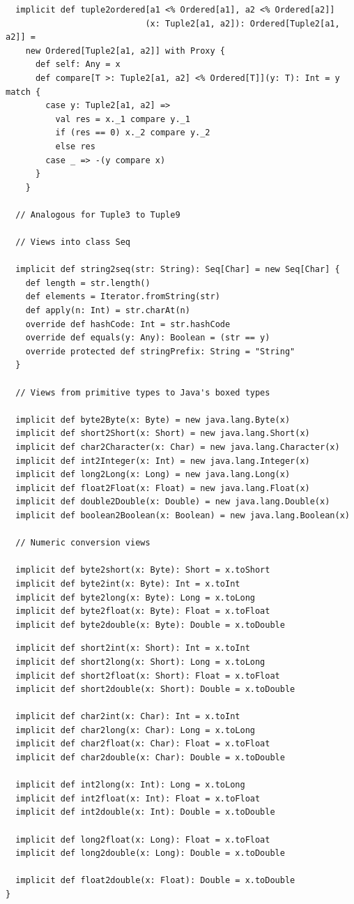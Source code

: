\begin{lstlisting}
  implicit def tuple2ordered[a1 <% Ordered[a1], a2 <% Ordered[a2]]
                            (x: Tuple2[a1, a2]): Ordered[Tuple2[a1, a2]] = 
    new Ordered[Tuple2[a1, a2]] with Proxy {
      def self: Any = x
      def compare[T >: Tuple2[a1, a2] <% Ordered[T]](y: T): Int = y match {
        case y: Tuple2[a1, a2] => 
          val res = x._1 compare y._1
          if (res == 0) x._2 compare y._2
          else res
        case _ => -(y compare x)
      }
    }

  // Analogous for Tuple3 to Tuple9

  // Views into class Seq

  implicit def string2seq(str: String): Seq[Char] = new Seq[Char] {
    def length = str.length()
    def elements = Iterator.fromString(str)
    def apply(n: Int) = str.charAt(n)
    override def hashCode: Int = str.hashCode
    override def equals(y: Any): Boolean = (str == y)
    override protected def stringPrefix: String = "String"
  }

  // Views from primitive types to Java's boxed types

  implicit def byte2Byte(x: Byte) = new java.lang.Byte(x)
  implicit def short2Short(x: Short) = new java.lang.Short(x)
  implicit def char2Character(x: Char) = new java.lang.Character(x)
  implicit def int2Integer(x: Int) = new java.lang.Integer(x)
  implicit def long2Long(x: Long) = new java.lang.Long(x)
  implicit def float2Float(x: Float) = new java.lang.Float(x)
  implicit def double2Double(x: Double) = new java.lang.Double(x)
  implicit def boolean2Boolean(x: Boolean) = new java.lang.Boolean(x)

  // Numeric conversion views

  implicit def byte2short(x: Byte): Short = x.toShort
  implicit def byte2int(x: Byte): Int = x.toInt
  implicit def byte2long(x: Byte): Long = x.toLong
  implicit def byte2float(x: Byte): Float = x.toFloat
  implicit def byte2double(x: Byte): Double = x.toDouble

\end{lstlisting}
\newpage
\begin{lstlisting}
  implicit def short2int(x: Short): Int = x.toInt
  implicit def short2long(x: Short): Long = x.toLong
  implicit def short2float(x: Short): Float = x.toFloat
  implicit def short2double(x: Short): Double = x.toDouble

  implicit def char2int(x: Char): Int = x.toInt
  implicit def char2long(x: Char): Long = x.toLong
  implicit def char2float(x: Char): Float = x.toFloat
  implicit def char2double(x: Char): Double = x.toDouble

  implicit def int2long(x: Int): Long = x.toLong
  implicit def int2float(x: Int): Float = x.toFloat
  implicit def int2double(x: Int): Double = x.toDouble

  implicit def long2float(x: Long): Float = x.toFloat
  implicit def long2double(x: Long): Double = x.toDouble

  implicit def float2double(x: Float): Double = x.toDouble
}
\end{lstlisting}


